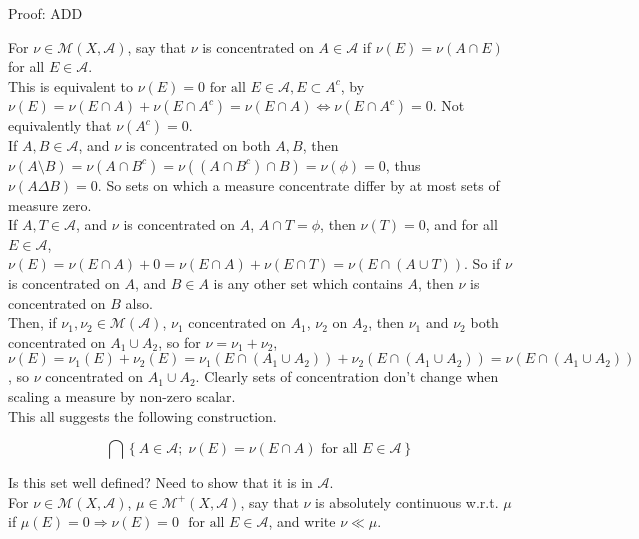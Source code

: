 \documentclass[12pt]{article}
\newcommand{\fall}[0] { \textrm{ for all } }
\newcommand{\A}[0] { \mathcal{A} }
\newcommand{\M}[0] { \mathcal{M} }
\newcommand{\rimply}[0] { \Rightarrow }
\newcommand{\lrimply}[0] { \Leftrightarrow }
\begin{document}
\noindent
Proof: ADD \\





\break

For $\nu \in \M(X, \A)$, say that $\nu$ is concentrated on $A \in \A$ if $\nu(E) = \nu(A \cap E)$ for all $E \in \A$. \\

\noindent
This is equivalent to $\nu(E) = 0 \fall E \in \A, E \subset A^c$, by $\nu(E) = \nu(E \cap A) + \nu( E \cap A^c) = \nu(E \cap A) \lrimply \nu( E \cap A^c) = 0$.  Not equivalently that $\nu(A^c) = 0$. \\


\noindent
If $A,B \in \A$, and $\nu$ is concentrated on both $A,B$, then $\nu(A \setminus B) = \nu( A \cap B^c) = \nu( (A \cap B^c) \cap B ) = \nu( \phi ) = 0$, thus $\nu( A \Delta B) = 0$. So sets on which a measure concentrate differ by at most sets of measure zero. \\


\noindent
If $A,T \in \A$, and $\nu$ is concentrated on $A$, $A \cap T = \phi$, then $\nu(T) = 0$, and for all $E \in \A$, $\nu(E) = \nu(E \cap A) + 0 = \nu(E \cap A) + \nu(E \cap T) = \nu(E \cap (A \cup T))$. So if $\nu$ is concentrated on $A$, and $B \in A$ is any other set which contains $A$, then $\nu$ is concentrated on $B$ also. \\


\noindent
Then, if $\nu_1, \nu_2 \in \M(\A)$, $\nu_1$ concentrated on $A_1$, $\nu_2$ on $A_2$, then $\nu_1$ and $\nu_2$ both concentrated on $A_1 \cup A_2$, so for $\nu = \nu_1 + \nu_2$, $\nu(E) = \nu_1(E) + \nu_2(E) = \nu_1(E \cap (A_1 \cup A_2) ) + \nu_2(E \cap (A_1 \cup A_2) ) = \nu(E \cap (A_1 \cup A_2))$, so $\nu$ concentrated on $A_1\cup A_2$. Clearly sets of concentration don't change when scaling a measure by non-zero scalar. \\



\noindent
This all suggests the following construction.

$$
    \bigcap \left\{ A \in \A ; \; \nu(E) = \nu(E \cap A) \fall E \in \A  \right\}
$$

\noindent
Is this set well defined? Need to show that it is in $\A$. \\


For $\nu \in \M(X, \A)$, $\mu \in \M^+(X, \A)$, say that $\nu$ is absolutely continuous w.r.t. $\mu$ if $\mu(E) = 0 \rimply \nu(E) = 0$ $\fall E \in \A$, and write $\nu \ll \mu$. \\
\end{document}
